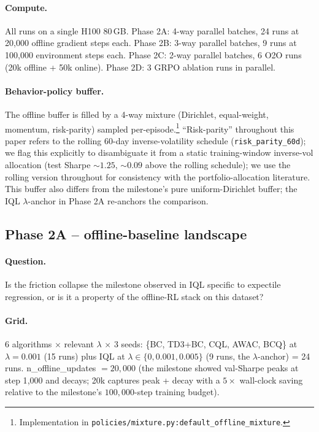 \paragraph{Compute.} All runs on a single H100 80\,GB. Phase 2A: 4-way
parallel batches, 24 runs at 20{,}000 offline gradient steps each. Phase
2B: 3-way parallel batches, 9 runs at 100{,}000 environment steps each.
Phase 2C: 2-way parallel batches, 6 O2O runs (20k offline + 50k online).
Phase 2D: 3 GRPO ablation runs in parallel.

\paragraph{Behavior-policy buffer.} The offline buffer is filled by a
4-way mixture (Dirichlet, equal-weight, momentum, risk-parity) sampled
per-episode.\footnote{Implementation in
\texttt{policies/mixture.py:default\_offline\_mixture}.}
``Risk-parity'' throughout this paper refers to the rolling 60-day
inverse-volatility schedule (\texttt{risk\_parity\_60d}); we flag this
explicitly to disambiguate it from a static training-window
inverse-vol allocation (test Sharpe ${\sim}1.25$, ${\sim}0.09$ above
the rolling schedule);
we use the rolling version throughout for consistency with the
portfolio-allocation literature. This buffer also differs from the
milestone's pure uniform-Dirichlet buffer; the IQL $\lambda$-anchor in
Phase 2A re-anchors the comparison.

\subsection{Phase 2A -- offline-baseline landscape}
\label{sec:experiments:phase2a}

\paragraph{Question.} Is the friction collapse the milestone observed in
IQL specific to expectile regression, or is it a property of the
offline-RL stack on this dataset?

\paragraph{Grid.} 6 algorithms $\times$ relevant $\lambda$ $\times$ 3
seeds: \{BC, TD3+BC, CQL, AWAC, BCQ\} at $\lambda{=}0.001$ (15 runs)
plus IQL at $\lambda \in \{0, 0.001, 0.005\}$ (9 runs, the $\lambda$-anchor)
= 24 runs. n\_offline\_updates $= 20{,}000$ (the milestone showed
val-Sharpe peaks at step 1{,}000 and decays; 20k captures peak + decay
with a $5\times$ wall-clock saving relative to the milestone's
$100{,}000$-step training budget).

